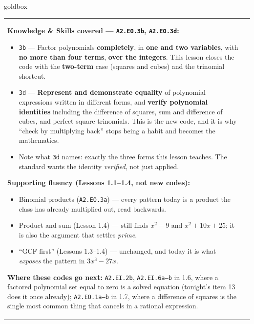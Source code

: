 \documentclass[10pt]{article}
\begin{document}
\renewcommand{\arraystretch}{1.6}
\begin{skillbox}{goldbox}
\begin{tabularx}{\linewidth}{@{}X|X@{}}
\begin{minipage}[t]{\linewidth}\vspace{0pt}
\textbf{Knowledge \& Skills covered --- \texttt{A2.EO.3b}, \texttt{A2.EO.3d}:}
\begin{itemize}[leftmargin=1.1em, itemsep=2pt, topsep=2pt]
  \item \texttt{3b} --- Factor polynomials \textbf{completely}, in \textbf{one and two variables},
        with \textbf{no more than four terms}, \textbf{over the integers}. This lesson closes the
        code with the \textbf{two-term} case (squares and cubes) and the trinomial shortcut.
  \item \texttt{3d} --- \textbf{Represent and demonstrate equality} of polynomial expressions
        written in different forms, and \textbf{verify polynomial identities} including the
        difference of squares, sum and difference of cubes, and perfect square trinomials. This is
        the new code, and it is why ``check by multiplying back'' stops being a habit and becomes
        the mathematics.
  \item Note what \texttt{3d} names: exactly the three forms this lesson teaches. The standard
        wants the identity \emph{verified}, not just applied.
\end{itemize}
\textbf{Supporting fluency (Lessons 1.1--1.4, not new codes):}
\begin{itemize}[leftmargin=1.1em, itemsep=2pt, topsep=2pt]
  \item Binomial products (\texttt{A2.EO.3a}) --- every pattern today is a product the class has
        already multiplied out, read backwards.
  \item Product-and-sum (Lesson 1.4) --- still finds $x^2-9$ and $x^2+10x+25$; it is also the
        argument that settles \emph{prime}.
  \item ``GCF first'' (Lessons 1.3--1.4) --- unchanged, and today it is what \emph{exposes} the
        pattern in $3x^3-27x$.
\end{itemize}
\textbf{Where these codes go next:} \texttt{A2.EI.2b}, \texttt{A2.EI.6a--b} in 1.6, where a factored
polynomial set equal to zero is a solved equation (tonight's item 13 does it once already);
\texttt{A2.EO.1a--b} in 1.7, where a difference of squares is the single most common thing that
cancels in a rational expression.

\end{minipage}
\end{tabularx}
\end{skillbox}
\end{document}
